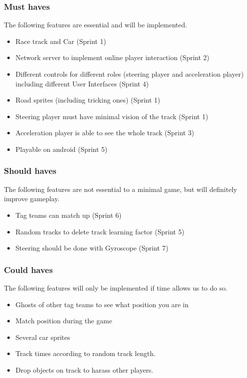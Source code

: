 \documentclass{article}
\begin{document}
\subsubsection{Must haves}
The following features are essential and will be implemented.
\begin{itemize}
	\item Race track and Car (Sprint 1)
	\item Network server to implement online player interaction (Sprint 2)
	\item Different controls for different roles (\gls{steering player} and \gls{acceleration player}) including different User Interfaces (Sprint 4)
	\item Road sprites (including tricking ones) (Sprint 1)
    \item Steering player must have minimal vision of the track (Sprint 1)
    \item Acceleration player is able to see the whole track (Sprint 3)
    \item Playable on android (Sprint 5)
\end{itemize}
\subsubsection{Should haves}
The following features are not essential to a minimal game, but will definitely improve gameplay.
\begin{itemize}
    \item Tag teams can match up (Sprint 6)  
    \item Random tracks to delete track learning factor (Sprint 5)
    \item Steering should be done with \gls{Gyroscope} (Sprint 7)
\end{itemize}
\subsubsection{Could haves}
The following features will only be implemented if time allows us to do so.
\begin{itemize}
    \item \gls{Ghosts} of other tag teams to see what position you are in 
    \item Match position during the game
    \item Several car sprites
    \item Track times according to random track length.
    \item Drop objects on track to harass other players.
\end{itemize}
\end{document}

